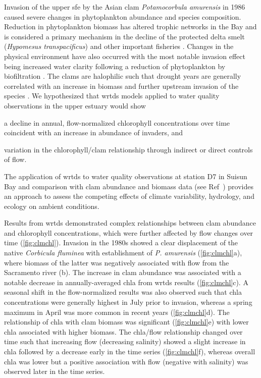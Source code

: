 \documentclass[journal = esthag, manuscript = article]{achemso}\usepackage[]{graphicx}\usepackage[]{color}
\begin{document}
Invasion of the upper \ac{sfe} by the Asian clam \textit{Potamocorbula amurensis} in 1986 caused severe changes in phytoplankton abundance and species composition.  Reduction in phytoplankton biomass has altered trophic networks in the Bay and is considered a primary mechanism in the decline of the protected delta smelt (\textit{Hypomesus transpacificus}) and other important fisheries \cite{Feyrer03,MacNally10}.  Changes in the physical environment have also occurred with the most notable invasion effect being increased water clarity following a reduction of phytoplankton by biofiltration \cite{MacNally10}. The clams are halophilic such that drought years are generally correlated with an increase in biomass and further upstream invasion of the species \cite{Parchaso02,Cloern12b}. We hypothesized that \ac{wrtds} models applied to water quality observations in the upper estuary would show \begin{inparaenum}[1\upshape)]
\item a decline in annual, flow-normalized chlorophyll concentrations over time coincident with an increase in abundance of invaders, and
\item variation in the chlorophyll/clam relationship through indirect or direct controls of flow.
\end{inparaenum}
The application of \ac{wrtds} to water quality observations at station D7 in Suisun Bay and comparison with clam abundance and biomass data (see Ref~) provides an approach to assess the competing effects of climate variability, hydrology, and ecology on ambient conditions.

Results from \ac{wrtds} demonstrated complex relationships between clam abundance and chlorophyll concentrations, which were further affected by flow changes over time (\cref{fig:clmchl}).  Invasion in the 1980s showed a clear displacement of the native \textit{Corbicula fluminea} with establishment of \textit{P. amurensis} (\cref{fig:clmchl}a), where biomass of the latter was negatively associated with flow from the Sacramento river (b).  The increase in clam abundance was associated with a notable decrease in annually-averaged \ac{chla} from \ac{wrtds} results (\cref{fig:clmchl}c).  A seasonal shift in the flow-normalized results was also observed such that \ac{chla} concentrations were generally highest in July prior to invasion, whereas a spring maximum in April was more common in recent years (\cref{fig:clmchl}d). The relationship of \ac{chla} with clam biomass was significant (\cref{fig:clmchl}e) with lower \ac{chla} associated with higher biomass.  The \ac{chla}/flow relationship changed over time such that increasing flow (decreasing salinity) showed a slight increase in \ac{chla} followed by a decrease early in the time series (\cref{fig:clmchl}f), whereas overall \ac{chla} was lower but a positive association with flow (negative with salinity) was observed later in the time series. 
\end{document}
